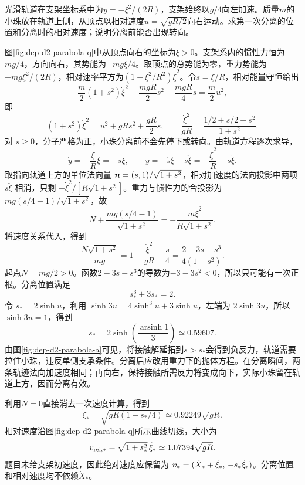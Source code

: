 \begin{example}[向左加速的凸抛物线支架]
光滑轨道在支架坐标系中为$y=-\xi^2/(2R)$，支架始终以$g/4$向左加速。质量$m$的小珠放在轨道上侧，从顶点以相对速度$u=\sqrt{gR/2}$向右运动。求第一次分离的位置和分离时的相对速度；说明分离前能否出现转向。
\end{example}
\begin{solution}
图\ref{fig:dep-d2-parabola-q}中从顶点向右的坐标为$\xi>0$。支架系内的惯性力恒为$mg/4$，方向向右，其势能为$-mg\xi/4$。取顶点的总势能为零，重力势能为$-mg\xi^2/(2R)$，相对速率平方为$(1+\xi^2/R^2)\dot\xi^2$。令$s=\xi/R$，相对能量守恒给出
\[
\frac m2(1+s^2)\dot\xi^2-\frac{mgR}{2}s^2-\frac{mgR}{4}s
=\frac m2u^2,
\]
即
\[
 (1+s^2)\dot\xi^2=u^2+gRs^2+\frac{gR}{2}s,
 \qquad
 \frac{\dot\xi^2}{gR}=\frac{1/2+s/2+s^2}{1+s^2}.
\]
对 $s\geq0$，分子严格为正，小珠分离前不会先停下或转向。由轨道方程逐次求导，
\[
\dot y=-\frac\xi R\dot\xi=-s\dot\xi,
\qquad \ddot y=-\dot s\dot\xi-s\ddot\xi
=-\frac{\dot\xi^2}R-s\ddot\xi.
\]
取指向轨道上方的单位法向量 $\bm{n}=(s,1)/\sqrt{1+s^2}$，相对加速度的法向投影中两项 $s\ddot\xi$ 相消，只剩 $-\dot\xi^2/[R\sqrt{1+s^2}]$。重力与惯性力的合投影为 $mg(s/4-1)/\sqrt{1+s^2}$，故
\[
N+\frac{mg(s/4-1)}{\sqrt{1+s^2}}
=-\frac{m\dot\xi^2}{R\sqrt{1+s^2}}.
\]
将速度关系代入，得到
\[
 \frac{N\sqrt{1+s^2}}{mg}
 =1-\frac{\dot\xi^2}{gR}-\frac s4
 =\frac{2-3s-s^3}{4(1+s^2)}.
\]
起点$N=mg/2>0$。函数$2-3s-s^3$的导数为$-3-3s^2<0$，所以只可能有一次正根。分离位置满足
\[
 s_*^3+3s_*=2.
\]
令 $s_*=2\sinh u$，利用 $\sinh3u=4\sinh^3u+3\sinh u$，左端为 $2\sinh3u$，所以 $\sinh3u=1$，得到
\[
 s_*=2\sinh\!\left(\frac{\operatorname{arsinh}1}{3}\right)
 \simeq0.59607.
\]
由图\ref{fig:dep-d2-parabola-a}可见，将接触解延拓到$s>s_*$会得到负反力，轨道需要拉住小珠，违反单侧支承条件。分离后应改用重力下的抛体方程。在分离瞬间，两条轨迹法向加速度相同；再向右，保持接触所需反力将变成向下，实际小珠留在轨道上方，因而分离有效。

利用$N=0$直接消去一次速度计算，得到
\[
 \dot\xi_*=\sqrt{gR(1-s_*/4)}\simeq0.92249\sqrt{gR}.
\]
相对速度沿图\ref{fig:dep-d2-parabola-q}所示曲线切线，大小为
\[
 v_{{\rm rel},*}=\sqrt{1+s_*^2}\,\dot\xi_*
 \simeq1.07394\sqrt{gR}.
\]
题目未给支架初速度，因此绝对速度应保留为
$\bm{v}_*=(\dot X_*+\dot\xi_*,\,-s_*\dot\xi_*)$。分离位置和相对速度均不依赖$\dot X_*$。
\end{solution}
